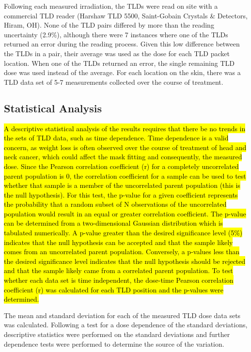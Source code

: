 Following each measured irradiation, the TLDs were read on site with a commercial TLD reader (Harshaw TLD 5500, Saint-Gobain Crystals \& Detectors, Hiram, OH). None of the TLD pairs differed by more than the reading uncertainty (2.9\%), although there were 7 instances where one of the TLDs returned an error during the reading process. Given this low difference between the TLDs in a pair, their average was used as the dose for each TLD packet location. When one of the TLDs returned an error, the single remaining TLD dose was used instead of the average. For each location on the skin, there was a TLD data set of 5-7 measurements collected over the course of treatment.

\subsection{Statistical Analysis}
\hl{A descriptive statistical analysis of the results requires that there be no trends in the sets of TLD data, such as time dependence. Time dependence is a valid concern, as weight loss is often observed over the course of treatment of head and neck cancer, which could affect the mask fitting and consequently, the measured dose. Since the Pearson correlation coefficient (r) for a completely uncorrelated parent population is 0, the correlation coefficient for a sample can be used to test whether that sample is a member of the uncorrelated parent population (this is the null hypothesis). For this test, the p-value for a given coefficient represents the probability that a random subset of N observations of the uncorrelated population would result in an equal or greater correlation coefficient. The p-value can be determined from a two-dimensional Gaussian distribution which is tabulated numerically. A p-value greater than the desired significance level (5\%) indicates that the null hypothesis can be accepted and that the sample likely comes from an uncorrelated parent population. Conversely, a p-values less than the desired significance level indicates that the null hypothesis should be rejected and that the sample likely came from a correlated parent population. To test whether each data set is time independent, the dose-time Pearson correlation coefficient (r) was calculated for each TLD position and the p-values were determined.}\cite{Bevington2003}

The mean and standard deviation for each of the measured TLD dose data sets was calculated. Following a test for a dose dependence of the standard deviations, descriptive statistics were performed on the standard deviations and further dependence tests were performed to determine the source of the variation.

